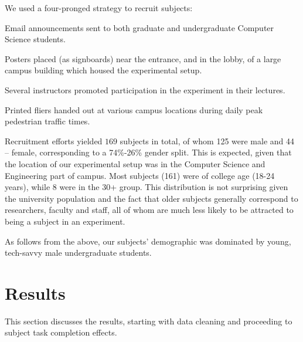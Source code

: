 \documentclass{llncs}
\begin{document}
We used a four-pronged strategy to recruit subjects:
%
\begin{compactenum}
\item Email announcements sent to both graduate and undergraduate 
Computer Science students. 
\item Posters placed (as signboards) near the entrance, and in the lobby, of a 
large campus building which housed the experimental setup. 
\item Several instructors promoted participation in the experiment in
their lectures. 
\item Printed fliers handed out at various campus locations during daily peak pedestrian traffic times.
\end{compactenum}

Recruitment efforts yielded $169$ subjects in total, of whom 125 were male and 44 -- female,
corresponding to a 74\%-26\% gender split.  This is expected, given that
the location of our experimental setup was in the
Computer Science and Engineering part of campus. Most subjects (161) were 
of college age (18-24 years), while 8 were in the 30+ group. This distribution is 
not surprising given the university population and the fact that older subjects 
generally correspond to researchers, faculty and staff, all of whom are much 
less likely to be attracted to being a subject in an experiment. 

As follows from the above, our subjects' demographic was dominated by young, tech-savvy 
male undergraduate students. 

\section{Results}
\label{sec:results}
%
This section discusses the results, starting with data cleaning and proceeding to
subject task completion effects.
\end{document}
